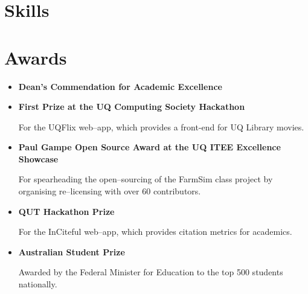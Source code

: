 \documentclass[a4paper]{article}
\newcommand{\dateitem}[1] {\item[\textbf{#1 :}]}
\newlength{\jeroenlen}
\newenvironment{languages}
{\settowidth{\jeroenlen}{\textbf{Languages:}}%
	\begin{description}[leftmargin=\jeroenlen,labelwidth=0pt,labelsep=0pt]
		\item[\textbf{Languages:}]%
		\begin{itemize}[leftmargin=0.5em,labelsep=.5em]}
		{\end{itemize}\end{description}}
\begin{document}
\section*{Skills}

\section*{Awards}
\begin{itemize}
	\dateitem{2016} \textbf{Dean's Commendation for Academic Excellence}
	\dateitem{2016} {\textbf{First Prize at the UQ Computing Society Hackathon}
		
		For the UQFlix web--app, which provides a front-end for UQ Library movies.
	}
	\dateitem{2015} {\textbf{Paul Gampe Open Source Award at the UQ ITEE Excellence Showcase}
		
		For spearheading the open--sourcing of the FarmSim class project by organising re--licensing with over 60 contributors.
	}
	\dateitem{2015} {\textbf{QUT Hackathon Prize}
		
		For the InCiteful web--app, which provides citation metrics for academics.
	}
	\dateitem{2013} {\textbf{Australian Student Prize}
		
		Awarded by the Federal Minister for Education to the top 500 students nationally.
	}
\end{itemize}
\end{document}
